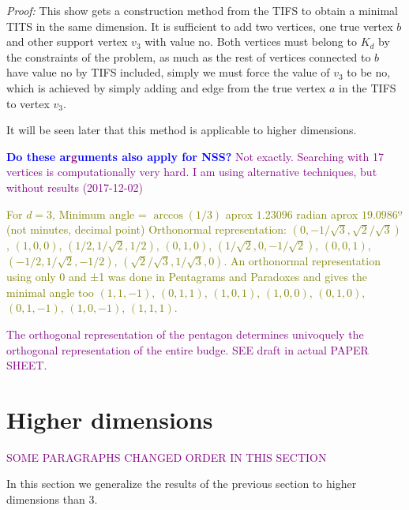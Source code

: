 \documentclass[%
  twocolumn,
 showpacs,
 showkeys,
 preprintnumbers,
 amsmath,amssymb,
 aps,
  pra,
  longbibliography,
 floatfix,
 ]{revtex4-1}
\newcommand{\karl}[1]{\textcolor{blue}{#1}}
\newcommand{\jr}[1]{\textcolor{purple}{#1}}
\newcommand{\meil}[1]{\textcolor{olive}{#1}}
\def\endproof{ }
\begin{document}

{\em Proof:} This show gets a construction method from the TIFS to obtain a minimal TITS in the same dimension.
It is sufficient to add two vertices, one true vertex $ b $ and other support vertex $ v_3 $ with value no.
Both vertices must belong to $K_d$ by the constraints of the problem, as much as the rest of vertices connected
to $ b $ have value no by TIFS included, simply we must force the value of $ v_3 $ to be no,
which is achieved by simply adding and edge from the true vertex $a$ in the TIFS to vertex $ v_3 $. \endproof

It will be seen later that this method is applicable to higher dimensions.


\karl{\bf Do these ar\jr{g}uments also apply for NSS?}
\jr{Not exactly. Searching with 17 vertices is computationally very hard. I am using alternative techniques, but without results (2017-12-02)}

\meil{For $d=3$, Minimum angle = $\arccos(1/3)$ aprox $1.23096$ radian aprox $19.0986º$ (not minutes, decimal point)
Orthonormal representation:
$(0,-1/\sqrt{3},\sqrt{2}/\sqrt{3})$, $(1,0,0)$, $(1/2,1/\sqrt{2},1/2)$, $(0,1,0)$, $(1/\sqrt{2},0,-1/\sqrt{2})$, $(0,0,1)$,
$(-1/2,1/\sqrt{2},-1/2)$, $(\sqrt{2}/\sqrt{3},1/\sqrt{3},0)$.
An orthonormal representation using only 0 and ±1 was done in Pentagrams and Paradoxes and gives the minimal angle too
$(1,1,-1)$, $(0,1,1)$, $(1,0,1)$, $(1,0,0)$, $(0,1,0)$, $(0,1,-1)$, $(1,0,-1)$, $(1,1,1)$.}

\jr{\sc The orthogonal representation of the pentagon determines univoquely the orthogonal representation of the entire budge. SEE draft
in actual PAPER SHEET.}


\section{Higher dimensions}

\jr{SOME PARAGRAPHS CHANGED ORDER IN THIS SECTION}


In this section we generalize the results of the previous section to higher dimensions than 3.
\end{document}
